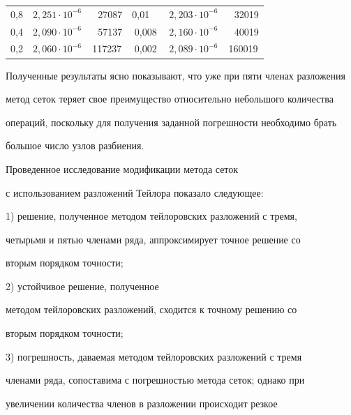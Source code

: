 \begin{table}[h!]
\begin{tabular}{c|c|c|c|c|c}
\hline

\rule{0mm}{12pt}%

0,8 & $2,251 \cdot 10^{-6}$ & ~\,27087 & 0,01~~ & $2,203 \cdot 10^{-6}$ & ~\,32019 \\ 

0,4 & $2,090 \cdot 10^{-6}$ & ~\,57137 & 0,008 & $2,160 \cdot 10^{-6}$ & ~\,40019 \\ 

0,2 & $2,060 \cdot 10^{-6}$ & 117237 & 0,002 & $2,089 \cdot 10^{-6}$ & 160019 \\ \hline

\end{tabular}

\end{table}









Полученные результаты ясно показывают, что уже при пяти членах разложения

метод сеток теряет свое преимущество относительно небольшого количества

операций, поскольку для получения заданной погрешности необходимо брать

большое число узлов разбиения.



\smallskip



 Проведенное исследование модификации метода сеток

с использованием разложений Тейлора показало следующее:



1) решение, полученное методом тейлоровских разложений с тремя,

четырьмя и пятью членами ряда, аппроксимирует точное решение со

вторым порядком точности;



2) устойчивое решение, полученное

методом тейлоровских разложений, сходится к точному решению со

вторым порядком точности;



3) погрешность, даваемая методом тейлоровских разложений с тремя

членами ряда, сопоставима с погрешностью метода сеток; однако при

увеличении количества членов в разложении происходит резкое

